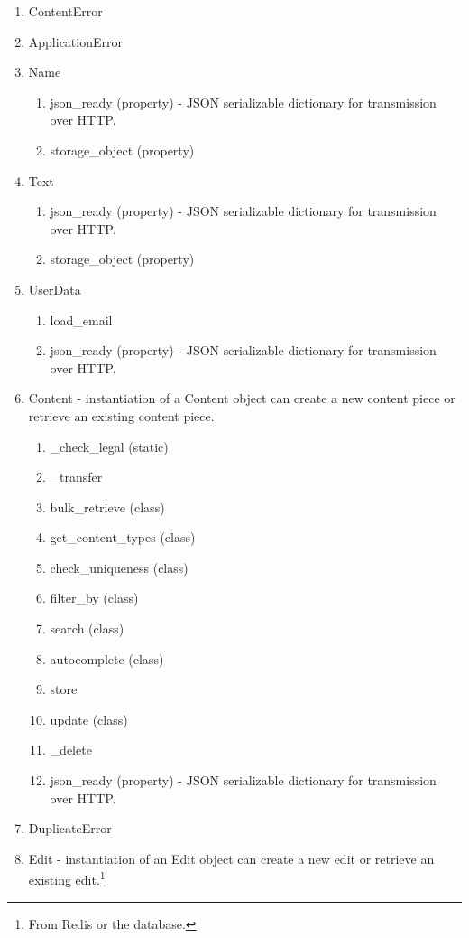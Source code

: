 \documentclass[12pt,letterpaper]{article}
\begin{document}
\begin{enumerate}
\item[] ContentError
\item[] ApplicationError
\item[] Name
\begin{enumerate}
\item[] json\_ready (property) - JSON serializable dictionary for transmission over HTTP.
\item[] storage\_object (property)
\end{enumerate}
\item[] Text
\begin{enumerate}
\item[] json\_ready (property) - JSON serializable dictionary for transmission over HTTP.
\item[] storage\_object (property)
\end{enumerate}
\item[] UserData
\begin{enumerate}
\item[] load\_email
\item[] json\_ready (property) - JSON serializable dictionary for transmission over HTTP.
\end{enumerate}
\item[] Content - instantiation of a Content object can create a new content piece or retrieve an existing content piece. 
\begin{enumerate}
\item[] \_check\_legal (static)
\item[] \_transfer
\item[] bulk\_retrieve (class)
\item[] get\_content\_types (class)
\item[] check\_uniqueness (class)
\item[] filter\_by (class)
\item[] search (class)
\item[] autocomplete (class)
\item[] store
\item[] update (class)
\item[] \_delete
\item[] json\_ready (property) - JSON serializable dictionary for transmission over HTTP.
\end{enumerate}
\item[] DuplicateError
\item[] Edit - instantiation of an Edit object can create a new edit or retrieve an existing edit.\footnote{From Redis or the database.}

\end{enumerate}
\end{document}
